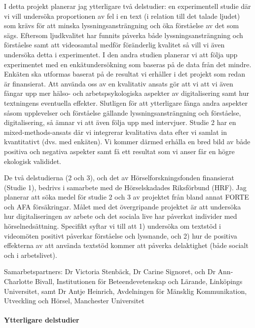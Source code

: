 \documentclass[]{article}
\begin{document}
I detta projekt planerar jag ytterligare två delstudier: en
experimentell studie där vi vill undersöka proportionen av fel i en text
(i relation till det talade ljudet) som krävs för att minska
lyssningsansträngning och öka förståelse av det som sägs. Eftersom
ljudkvalitet har funnits påverka både lyssningsansträngning och
förståelse samt att videosamtal medför föränderlig kvalitet så vill vi
även undersöka detta i experimentet. I den andra studien planerar vi att
följa upp experimentet med en enkätundersökning som baseras på de data
från det mindre. Enkäten ska utformas baserat på de resultat vi erhåller
i det projekt som redan är finansierat. Att använda oss av en kvalitativ
ansats gör att vi att vi även fångar upp mer hälso- och
arbetspsykologiska aspekter av digitalisering samt hur textningens
eventuella effekter. Slutligen för att ytterligare fånga andra aspekter
såsom upplevelser och förståelse gällande lyssningsansträngning och
förståelse, digitalisering, så ämnar vi att även följa upp med
intervjuer. Studie 2 har en mixed-methods-ansats där vi integrerar
kvalitativa data efter vi samlat in kvantitativt (dvs. med enkäten). Vi
kommer därmed erhålla en bred bild av både positiva och negativa
aspekter samt få ett resultat som vi anser får en högre ekologisk
valididet.

De två delstudierna (2 och 3), och det av Hörselforskningsfonden
finansierat (Studie 1), bedrivs i samarbete med de Hörselskadades
Riksförbund (HRF). Jag planerar att söka medel för studie 2 och 3 av
projektet från bland annat FORTE och AFA försäkringar. Målet med det
övergripande projektet är att undersöka hur digitaliseringen av arbete
och det sociala live har påverkat individer med hörselnedsättning.
Specifikt syftar vi till att 1) undersöka om textstöd i videomöten
positivt påverkar förståelse och lyssnande, och 2) hur de positiva
effekterna av att använda textstöd kommer att påverka delaktighet (både
socialt och i arbetslivet).

Samarbetspartners: Dr Victoria Stenbäck, Dr Carine Signoret, och Dr
Ann-Charlotte Bivall, Institutionen för Beteendevetenskap och Lärande,
Linköpings Universitet, samt Dr Antje Heinrich, Avdelningen för Mänsklig
Kommunikation, Utveckling och Hörsel, Manchester Universitet

\hypertarget{ytterligare-delstudier}{%
\paragraph{Ytterligare delstudier}\label{ytterligare-delstudier}}
\end{document}
